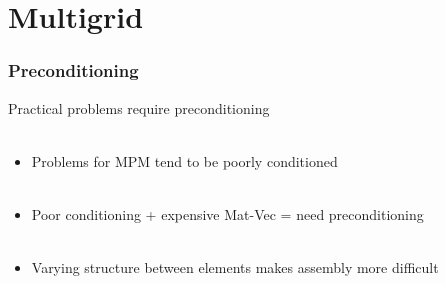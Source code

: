 \documentclass{beamer}
\begin{document}
\section{Multigrid}

\begin{frame}
\begin{center}
\frametitle{Preconditioning}

Practical problems require preconditioning\\

~\\

\begin{itemize}

\item Problems for MPM tend to be poorly conditioned\\

~\\

\item Poor conditioning + expensive Mat-Vec = need preconditioning\\

~\\

\item Varying structure between elements makes assembly more difficult\\

\end{itemize}

\end{center}
\end{frame}

\end{document}
